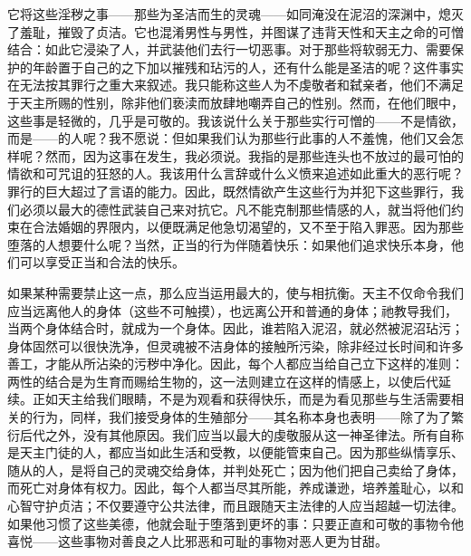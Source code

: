 它将这些淫秽之事——那些为圣洁而生的灵魂——如同淹没在泥沼的深渊中，熄灭了羞耻，摧毁了贞洁。它也混淆男性与男性，并图谋了违背天性和天主之命的可憎结合：如此它浸染了人，并武装他们去行一切恶事。对于那些将软弱无力、需要保护的年龄置于自己的之下加以摧残和玷污的人，还有什么能是圣洁的呢？这件事实在无法按其罪行之重大来叙述。我只能称这些人为不虔敬者和弑亲者，他们不满足于天主所赐的性别，除非他们亵渎而放肆地嘲弄自己的性别。然而，在他们眼中，这些事是轻微的，几乎是可敬的。我该说什么关于那些实行可憎的——不是情欲，而是——的人呢？我不愿说：但如果我们认为那些行此事的人不羞愧，他们又会怎样呢？然而，因为这事在发生，我必须说。我指的是那些连头也不放过的最可怕的情欲和可咒诅的狂怒的人。我该用什么言辞或什么义愤来追述如此重大的恶行呢？罪行的巨大超过了言语的能力。因此，既然情欲产生这些行为并犯下这些罪行，我们必须以最大的德性武装自己来对抗它。凡不能克制那些情感的人，就当将他们约束在合法婚姻的界限内，以便既满足他急切渴望的，又不至于陷入罪恶。因为那些堕落的人想要什么呢？当然，正当的行为伴随着快乐：如果他们追求快乐本身，他们可以享受正当和合法的快乐。\par

如果某种需要禁止这一点，那么应当运用最大的，使与相抗衡。天主不仅命令我们应当远离他人的身体（这些不可触摸），也远离公开和普通的身体；祂教导我们，当两个身体结合时，就成为一个身体。因此，谁若陷入泥沼，就必然被泥沼玷污；身体固然可以很快洗净，但灵魂被不洁身体的接触所污染，除非经过长时间和许多善工，才能从所沾染的污秽中净化。因此，每个人都应当给自己立下这样的准则：两性的结合是为生育而赐给生物的，这一法则建立在这样的情感上，以使后代延续。正如天主给我们眼睛，不是为观看和获得快乐，而是为看见那些与生活需要相关的行为，同样，我们接受身体的生殖部分——其名称本身也表明——除了为了繁衍后代之外，没有其他原因。我们应当以最大的虔敬服从这一神圣律法。所有自称是天主门徒的人，都应当如此生活和受教，以便能管束自己。因为那些纵情享乐、随从的人，是将自己的灵魂交给身体，并判处死亡；因为他们把自己卖给了身体，而死亡对身体有权力。因此，每个人都当尽其所能，养成谦逊，培养羞耻心，以和心智守护贞洁；不仅要遵守公共法律，而且跟随天主法律的人应当超越一切法律。如果他习惯了这些美德，他就会耻于堕落到更坏的事：只要正直和可敬的事物令他喜悦——这些事物对善良之人比邪恶和可耻的事物对恶人更为甘甜。\par


